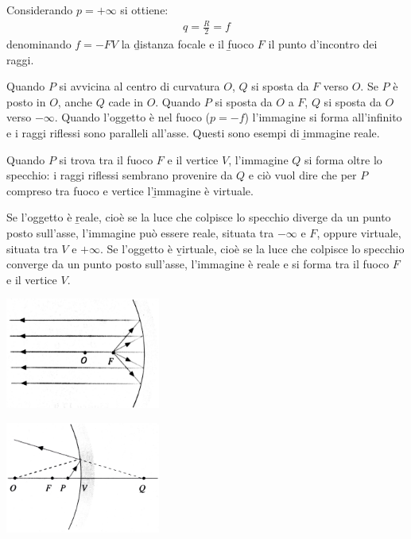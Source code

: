 Considerando $p=+\infty$ si ottiene:
\begin{equation}\begin{split}
q=\frac{R}{2}=f
\end{split}\end{equation}
denominando $f=-FV$ la \b{distanza focale} e il \b{fuoco} $F$ il punto d'incontro dei raggi.

Quando $P$ si avvicina al centro di curvatura $O$, $Q$ si sposta da $F$ verso $O$. Se $P$ è posto in $O$, anche $Q$ cade in $O$. Quando $P$ si sposta da $O$ a $F$, $Q$ si sposta da $O$ verso $-\infty$. Quando l'oggetto è nel fuoco ($p=-f$) l'immagine si forma all'infinito e i raggi riflessi sono paralleli all'asse. Questi sono esempi di \b{immagine reale}.

Quando $P$ si trova tra il fuoco $F$ e il vertice $V$, l'immagine $Q$ si forma oltre lo specchio: i raggi riflessi sembrano provenire da $Q$ e ciò vuol dire che per $P$ compreso tra fuoco e vertice l'\b{immagine è virtuale}.

Se l'oggetto è \b{reale}, cioè se la luce che colpisce lo specchio diverge da un punto posto sull'asse, l'immagine può essere reale, situata tra $-\infty$ e $F$, oppure virtuale, situata tra $V$ e $+\infty$. Se l'oggetto è \b{virtuale}, cioè se la luce che colpisce lo specchio converge da un punto posto sull'asse, l'immagine è reale e si forma tra il fuoco $F$ e il vertice $V$.

\begin{center}
\includegraphics[width=2in]{immagini/specchi3.jpg}
\end{center}
\begin{center}
\includegraphics[width=2in]{immagini/specchi4.jpg}
\end{center}

